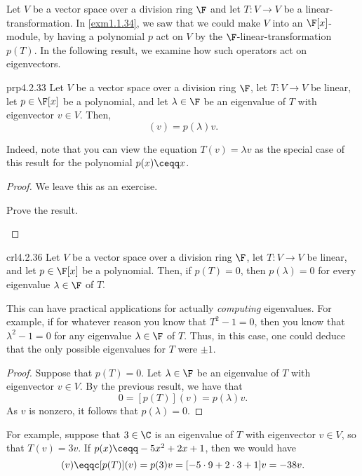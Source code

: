 Let $V$ be a vector space over a division ring $\F$ and let $T\colon V\rightarrow V$ be a linear-transformation.  In \cref{exm1.1.34}, we saw that we could make $V$ into an $\F [x]$-module, by having a polynomial $p$ act on $V$ by the $\F$-linear-transformation $p(T)$.  In the following result, we examine how such operators act on eigenvectors.
\begin{prp}{}{prp4.2.33}
	Let $V$ be a vector space over a division ring $\F$, let $T\colon V\rightarrow V$ be linear, let $p\in \F [x]$ be a polynomial, and let $\lambda \in \F$ be an eigenvalue of $T$ with eigenvector $v\in V$.  Then,
	\begin{equation}
		[p(T)](v)=p(\lambda )v.
	\end{equation}
	\begin{rmk}
		Indeed, note that you can view the equation $T(v)=\lambda v$ as the special case of this result for the polynomial $p(x)\ceqq x$.
	\end{rmk}
	\begin{proof}
		We leave this as an exercise.
		\begin{exr}[breakable=false]{}{}
			Prove the result.
		\end{exr}
	\end{proof}
\end{prp}
\begin{crl}{}{crl4.2.36}
	Let $V$ be a vector space over a division ring $\F$, let $T\colon V\rightarrow V$ be linear, and let $p\in \F [x]$ be a polynomial.  Then, if $p(T)=0$, then $p(\lambda )=0$ for every eigenvalue $\lambda \in \F$ of $T$.
	\begin{rmk}
		This can have practical applications for actually \emph{computing} eigenvalues.  For example, if for whatever reason you know that $T^2-1=0$, then you know that $\lambda ^2-1=0$ for any eigenvalue $\lambda \in \F$ of $T$.  Thus, in this case, one could deduce that the only possible eigenvalues for $T$ were $\pm 1$.
	\end{rmk}
	\begin{proof}
		Suppose that $p(T)=0$.  Let $\lambda \in \F$ be an eigenvalue of $T$ with eigenvector $v\in V$.  By the previous result, we have that
		\begin{equation}
			0=[p(T)](v)=p(\lambda )v.
		\end{equation}
		As $v$ is nonzero, it follows that $p(\lambda )=0$.
	\end{proof}
\end{crl}
\begin{exm}{}{}
	For example, suppose that $3\in \C$ is an eigenvalue of $T$ with eigenvector $v\in V$, so that $T(v)=3v$.  If $p(x)\ceqq -5x^2+2x+1$, then we would have
	\begin{equation}
		[-5T^2+2T+\id ](v)\eqqc [p(T)](v)=p(3)v=[-5\cdot 9+2\cdot 3+1]v=-38v.
	\end{equation}
\end{exm}

